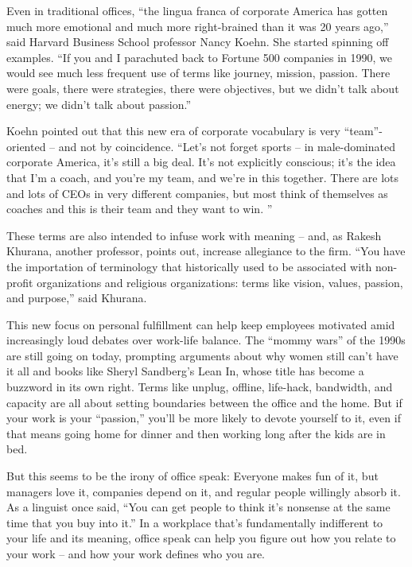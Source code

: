 Even in traditional offices, ``the lingua franca of corporate America has gotten much more emotional and much more right-brained than it was 20 years ago,'' said Harvard Business School professor Nancy Koehn. She started spinning off examples. ``If you and I parachuted back to Fortune 500 companies in 1990, we would see much less frequent use of terms like journey, mission, passion. There were goals, there were strategies, there were objectives, but we didn't talk about energy; we didn't talk about passion.''


Koehn pointed out that this new era of corporate vocabulary is very ``team''-oriented – and not by coincidence. ``Let's not forget sports – in male-dominated corporate America, it's still a big deal. It's not explicitly conscious; it's the idea that I'm a coach, and you're my team, and we're in this together. There are lots and lots of CEOs in very different companies, but most think of themselves as coaches and this is their team and they want to win. ''


These terms are also intended to infuse work with meaning – and, as Rakesh Khurana, another professor, points out, increase allegiance to the firm. ``You have the importation of terminology that historically used to be associated with non-profit organizations and religious organizations: terms like vision, values, passion, and purpose,'' said Khurana.


This new focus on personal fulfillment can help keep employees motivated amid increasingly loud debates over work-life balance. The ``mommy wars'' of the 1990s are still going on today, prompting arguments about why women still can't have it all and books like Sheryl Sandberg's Lean In, whose title has become a buzzword in its own right. Terms like unplug, offline, life-hack, bandwidth, and capacity are all about setting boundaries between the office and the home. But if your work is your ``passion,'' you'll be more likely to devote yourself to it, even if that means going home for dinner and then working long after the kids are in bed.


But this seems to be the irony of office speak: Everyone makes fun of it, but managers love it, companies depend on it, and regular people willingly absorb it. As a linguist once said, ``You can get people to think it's nonsense at the same time that you buy into it.'' In a workplace that's fundamentally indifferent to your life and its meaning, office speak can help you figure out how you relate to your work – and how your work defines who you are.



